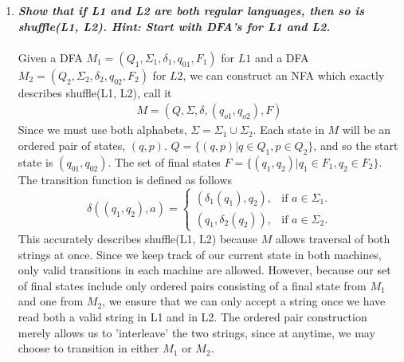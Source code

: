 \documentclass[a4paper]{article}
\begin{document}
\begin{enumerate}
\begin{enumerate}[1.]
\item \textbf{\emph{Show that if L1 and L2 are both regular languages, then so is shuffle(L1, L2). Hint: Start with DFA's for L1 and L2.}} \\
\\ 
Given a DFA $M_1 = (Q_1, \Sigma_1, \delta_1, q_{01}, F_1)$ for $L1$ and a DFA $M_2 = (Q_2, \Sigma_2, \delta_2, q_{02}, F_2)$ for $L2$, we can construct an NFA which exactly describes shuffle(L1, L2), call it 
\begin{align*}
M = (Q, \Sigma, \delta, (q_{o1},q_{o2}), F)
\end{align*}
Since we must use both alphabets, $\Sigma = \Sigma_1 \cup \Sigma_2$. Each state in $M$ will be an ordered pair of states, $(q, p)$. $Q = \{(q, p)| q \in Q_1, p \in Q_2\}$, and so the start state is $(q_{01},q_{02})$. The set of final states $F = \{(q_1, q_2)|q_1 \in F_1, q_2 \in F_2\}$. The transition function is defined as follows
\begin{equation*}
  \delta((q_1, q_2), a) =\begin{cases}
    (\delta_1(q_1), q_2), & \text{if $a \in \Sigma_1$}.\\
    (q_1, \delta_2(q_2)), & \text{if $a \in \Sigma_2$}.
  \end{cases}
\end{equation*}
This accurately describes shuffle(L1, L2) because $M$ allows traversal of both strings at once. Since we keep track of our current state in both machines, only valid transitions in each machine are allowed. However, because our set of final states include only ordered pairs consisting of a final state from $M_1$ and one from $M_2$, we ensure that we can only accept a string once we have read both a valid string in L1 and in L2. The ordered pair construction merely allows us to 'interleave' the two strings, since at anytime, we may choose to transition in either $M_1$ or $M_2$. \\




\end{enumerate}
\end{enumerate}
\end{document}
